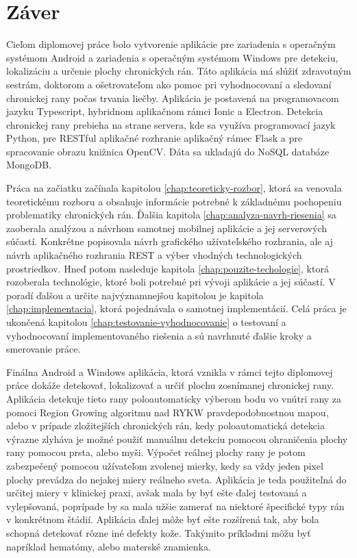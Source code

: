 \chapter{Záver}
Cieľom diplomovej práce bolo vytvorenie aplikácie pre zariadenia s operačným systémom Android a zariadenia s operačným systémom Windows pre detekciu, lokalizáciu a určenie plochy chronických rán. Táto aplikácia má slúžiť zdravotným sestrám, doktorom a ošetrovateľom ako pomoc pri vyhodnocovaní a sledovaní chronickej rany počas trvania liečby. Aplikácia je postavená na programovacom jazyku Typescript, hybridnom aplikačnom rámci Ionic a Electron. Detekcia chronickej rany prebieha na strane servera, kde sa využíva programovací jazyk Python, pre RESTful aplikačné rozhranie aplikačný rámec Flask a pre spracovanie obrazu knižnica OpenCV. Dáta sa ukladajú do NoSQL databáze MongoDB.

Práca na začiatku začínala kapitolou \ref{chap:teoreticky-rozbor}, ktorá sa venovala teoretickému rozboru a obsahuje informácie potrebné k základnému pochopeniu problematiky chronických rán. Ďalšia kapitola \ref{chap:analyza-navrh-riesenia} sa zaoberala analýzou a návrhom samotnej mobilnej aplikácie a jej serverových súčastí. Konkrétne popisovala návrh grafického užívateľského rozhrania, ale aj návrh aplikačného rozhrania REST a výber vhodných technologických prostriedkov. Hneď potom nasleduje kapitola \ref{chap:pouzite-techologie}, ktorá rozoberala technológie, ktoré boli potrebné pri vývoji aplikácie a jej súčastí. V poradí ďalšou a určite najvýznamnejšou kapitolou je kapitola \ref{chap:implementacia}, ktorá pojednávala o samotnej implementácií. Celá práca je ukončená kapitolou \ref{chap:testovanie-vyhodnocovanie} o testovaní a vyhodnocovaní implementovaného riešenia a sú navrhnuté ďalšie kroky a smerovanie práce.

Finálna Android a Windows aplikácia, ktorá vznikla v rámci tejto diplomovej práce dokáže detekovať, lokalizovať a určiť plochu zosnímanej chronickej rany. Aplikácia detekuje tieto rany poloautomaticky výberom bodu vo vnútri rany za pomoci Region Growing algoritmu nad RYKW pravdepodobnostnou mapou, alebo v prípade zložitejších chronických rán, kedy poloautomatická detekcia výrazne zlyháva je možné použiť manuálnu detekciu pomocou ohraničenia plochy rany pomocou prsta, alebo myši. Výpočet reálnej plochy rany je potom zabezpečený pomocou užívateľom zvolenej mierky, kedy sa vždy jeden pixel plochy prevádza do nejakej miery reálneho sveta. Aplikácia je teda použiteľná do určitej miery v klinickej praxi, avšak mala by byť ešte ďalej testovaná a vylepšovaná, poprípade by sa mala užšie zamerať na niektoré špecifické typy rán v konkrétnom štádií. Aplikácia ďalej môže byť ešte rozšírená tak, aby bola schopná detekovať rôzne iné defekty kože. Takýmito príkladmi môžu byť napríklad hematómy, alebo materské znamienka.